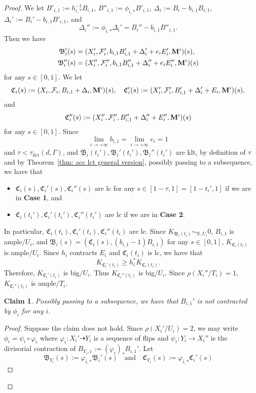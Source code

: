 \documentclass[11pt,reqno]{amsart}
\numberwithin{equation}{section}
\newcommand{\Mm}{{\bf{M}}}
\newcommand{\Cc}{\mathfrak{C}}
\newcommand{\ilct}{\operatorname{ilct}}
\newcommand{\Bb}{{\mathfrak{B}}}
\newcommand{\Ff}{\mathcal{F}}
\newcommand{\Ii}{\Gamma}
\newtheorem{claim}[thm]{Claim}
\theoremstyle{definition}
\begin{document}
\begin{proof}
We let $B'_{i,1}:=h_{i,*}^{-1}B_{i,1}$, $B''_{i,1}:=\phi_{i,*}B'_{i,1}$, $\Delta_i:=B_i-b_{i,1}B_{i,1}$, $\Delta_i':=B_i'-b_{i,1}B'_{i,1}$, and $$\Delta_i'':=\phi_{i,*}\Delta_i'=B_i''-b_{i,1}B''_{i,1}.$$
Then we have
\begin{align*}
\Bb_i'(s) &= (X_i',\Ff_i',b_{i,1}B'_{i,1}+\Delta_i'+e_iE_i',\Mm^i)(s),\\
\Bb_i''(s) &= (X_i'',\Ff_i'',b_{i,1}B''_{i,1}+\Delta_i''+e_iE_i'',\Mm^i)(s)
\end{align*}
for any $s\in [0,1]$. We let
$$\Cc_i(s):=(X_i,\Ff_i,B_{i,1}+\Delta_i,\Mm^i)(s),\quad \Cc_i'(s):=(X_i',\Ff_i',B_{i,1}'+\Delta_i'+E_i,\Mm^i)(s),$$
and
$$\Cc_i''(s):=(X_i'',\Ff_i'',B_{i,1}''+\Delta_i''+E_i'',\Mm^i)(s)$$
for any $s\in [0,1]$. Since $$\lim_{i\rightarrow+\infty}b_{i,1}=\lim_{i\rightarrow+\infty}e_i=1$$ 
and $\tau<\tau_{\ilct}(d,\Ii)$, and $\Bb_i(t_i'),\Bb_i'(t_i'),\Bb_i''(t_i')$ are klt, by definition of $\tau$ and by Theorem~\ref{thm: acc lct general version}, possibly passing to a subsequence, we have that
\begin{itemize}
    \item $\Cc_i(s),\Cc_i'(s),\Cc_i''(s)$ are lc for any $s\in [1-\tau,1]=[1-t_i',1]$ if we are in \textbf{Case 1}, and
    \item $\Cc_i(t_i'),\Cc_i'(t_i'),\Cc_i''(t_i')$ are lc if we are in \textbf{Case 2}. 
\end{itemize}
In particular, $\Cc_i(t_i),\Cc_i'(t_i),\Cc_i''(t_i)$ are lc. Since $K_{\Bb_i(t_i)}\sim_{\mathbb R,U_i}0$, $B_{i,1}$ is ample$/U_i$, and $\Bb_i(s)=(\Cc_i(s),(b_{i,1}-1)B_{i,1})$ for any $s\in [0,1]$, $K_{\Cc_i(t_i)}$ is ample$/U_i$. Since $h_i$ contracts $E_i$ and $\Cc_i(t_i)$ is lc, we have that
$$K_{\Cc_i'(t_i)}\geq h_i^*K_{\Cc_i(t_i)}.$$
Therefore, $K_{\Cc_i'(t_i)}$ is big$/U_i$. Thus $K_{\Cc_i''(t_i)}$ is big$/U_i$. Since $\rho(X_i''/T_i)=1$, $K_{\Cc_i''(t_i)}$ is ample$/T_i$. 
\begin{claim}\label{claim: no divisorial contraction}
    Possibly passing to a subsequence, we have that $B_{i,1}'$ is not contracted by $\phi_i$ for any $i$.
\end{claim}
\begin{proof}
    Suppose the claim does not hold. Since $\rho(X_i'/U_i)=2$, we may write $\phi_i=\psi_i\circ\varphi_i$ where $\varphi_i: X_i'\dashrightarrow Y_i$ is a sequence of flips and $\psi_i: Y_i\rightarrow X_i''$ is the divisorial contraction of $B_{Y_i,1}:=(\varphi_i)_*B_{i,1}'$. Let 
    $$\Bb_{Y_i}(s):=\varphi_{i,*}\Bb_i'(s) \quad \text{and}\quad \Cc_{Y_i}(s):=\varphi_{i,*}\Cc_i'(s)$$

\end{proof}
\end{proof}
\end{document}
